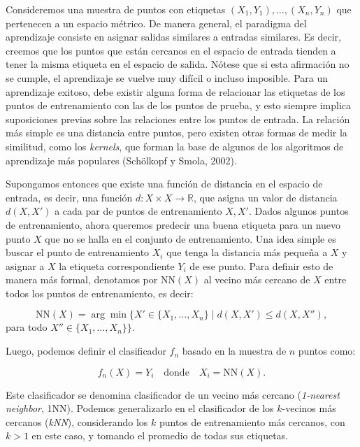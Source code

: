 \documentclass{article}
\begin{document}
Consideremos una muestra de puntos con etiquetas \((X_1, Y_1), \dots, (X_n, Y_n)\) que 
pertenecen a un espacio métrico. De manera general, el paradigma del aprendizaje consiste en asignar salidas 
similares a entradas similares. Es decir, creemos que los puntos que están cercanos en el espacio 
de entrada tienden a tener la misma etiqueta en el espacio de salida. Nótese que si esta afirmación 
no se cumple, el aprendizaje se vuelve muy difícil o incluso imposible. Para un aprendizaje exitoso, 
debe existir alguna forma de relacionar las etiquetas de los puntos de entrenamiento con las de los 
puntos de prueba, y esto siempre implica suposiciones previas sobre las relaciones entre los puntos 
de entrada. La relación más simple es una distancia entre puntos, pero existen otras formas de medir 
la similitud, como los \textit{kernels}, que forman la base de algunos de los algoritmos 
de aprendizaje más populares (Schölkopf y Smola, 2002).\newline

Supongamos entonces que existe una función de distancia en el espacio de entrada, es decir, una función 
\(d : X \times X \to \mathbb{R}\), que asigna un valor de distancia \(d(X, X')\) a cada par de puntos 
de entrenamiento \(X, X'\). Dados algunos puntos de entrenamiento, ahora queremos predecir una buena 
etiqueta para un nuevo punto \(X\) que no se halla en el conjunto de entrenamiento.
 Una idea simple es buscar el punto de entrenamiento \(X_i\) 
que tenga la distancia más pequeña a \(X\) y asignar a \(X\) la etiqueta correspondiente \(Y_i\) de 
ese punto. Para definir esto de manera más formal, denotamos por \(\text{NN}(X)\) al vecino más cercano 
de \(X\) entre todos los puntos de entrenamiento, es decir:

\[
\text{NN}(X) = \arg\min \{X' \in \{X_1, \dots, X_n\} \mid d(X, X') \leq d(X, X''), 
\]
para todo \( X'' \in \{X_1, \dots, X_n\}\}\). \newline

Luego, podemos definir el clasificador \(f_n\) basado en la muestra de \(n\) puntos como:

\[
f_n(X) = Y_i \quad \text{donde} \quad X_i = \text{NN}(X).
\]

Este clasificador se denomina clasificador de un vecino más cercano (\textit{1-nearest neighbor}, 1NN). 
Podemos generalizarlo en el clasificador de los \(k\)-vecinos más cercanos (\textit{kNN}), considerando los \(k\) puntos de 
entrenamiento más cercanos, con $k>1$ en este caso, y tomando el promedio de todas sus etiquetas. \newline
\end{document}
